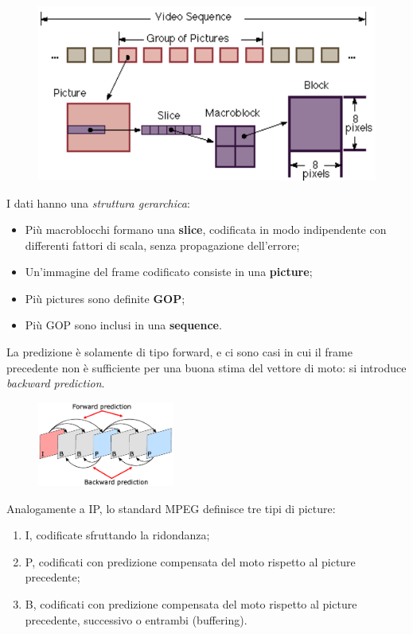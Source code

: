 \begin{figure}[h]
	\centering
	\includegraphics[scale=0.4]{Lezioni/Immagini/mpeg-gerarchica}
\end{figure}

I dati hanno una \textit{struttura gerarchica}:
\begin{itemize}
	\item Più macroblocchi formano una \textbf{slice}, codificata in modo indipendente con differenti fattori di scala, senza propagazione dell'errore;
	\item Un'immagine del frame codificato consiste in una \textbf{picture};
	\item Più pictures sono definite \textbf{GOP};
	\item Più GOP sono inclusi in una \textbf{sequence}.
\end{itemize}

La predizione è solamente di tipo forward, e ci sono casi in cui il frame precedente non è sufficiente per una buona stima del vettore di moto: si introduce \textit{backward prediction}.

 \begin{figure}
	\vspace{-10pt}
	\includegraphics[width=0.4\textwidth]{Lezioni/Immagini/ibp}
	\vspace{-30pt}
\end{figure}

Analogamente a IP, lo standard MPEG definisce tre tipi di picture:
\begin{enumerate}
	\item I, codificate sfruttando la ridondanza;
	\item P, codificati con predizione compensata del moto rispetto al picture precedente;
	\item B, codificati con predizione compensata del moto rispetto al picture precedente, successivo o entrambi (buffering).
\end{enumerate}

